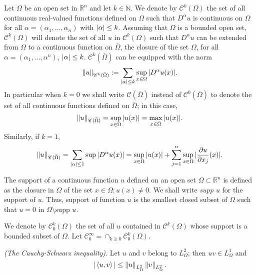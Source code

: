 \begin{notation}
	Let $\Omega$ be an open set in $\mathbb{R}^n$ and let $k \in \mathbb{N}$. We denote by $\mathscr{C}^k(\Omega)$ the set of all continuous real-valued functions defined on $\Omega$ such that $D^\alpha u$ is continuous on $\Omega$ for all $\alpha = (\alpha_1 , \dots, \alpha_n)$ with $\vert\alpha\vert \leq k$. Assuming that $\Omega$ is a bounded open set, $\mathscr{C}^k (\Omega)$ will denote the set of all $u$ in $\mathscr{C}^k (\Omega)$ such that $D^\alpha u$ can be extended from $\Omega$ to a
continuous function on $\bar{\Omega}$, the closure of the set $\Omega$, for all $\alpha = (\alpha_1 , \dots, \alpha^n)$, $\vert\alpha\vert \leq k$.
 $\mathscr{C}^k (\bar{\Omega})$ can be equipped with the norm
	\begin{equation*}
		\left\lVert u\right\rVert_{\mathscr{C}^k(\bar{\Omega})} := \sum_{\vert\alpha\vert \leq k} \sup_{x\in\Omega} \vert D^\alpha u(x)\vert.
	\end{equation*}
	In particular when $k = 0$ we shall write $\mathscr{C}(\bar{\Omega})$ instead of $\mathscr{C}^{0}(\bar{\Omega})$ to denote the set of
all continuous functions defined on $\bar{\Omega}$; in this case,
	\begin{equation*}
		\left\lVert u\right\rVert_{\mathscr{C}(\bar{\Omega})} = \sup_{x\in\Omega} \vert u(x)\vert = \max_{x\in\bar{\Omega}} \vert u(x)\vert.
	\end{equation*}
	Similarly, if $k = 1$,
	\begin{equation*}
		\left\lVert u\right\rVert_{\mathscr{C}(\bar{\Omega})} = \sum_{\vert\alpha\vert\leq 1} \sup \vert D^\alpha u(x)\vert = \sup_{x\in\Omega} \vert u(x)\vert + \sum_{j=1}^{n} \sup_{x\in\Omega} \vert\frac{\partial u}{\partial x_j}(x)\vert.
	\end{equation*}
\end{notation}
\begin{defn}
	The support of a continuous function $u$ defined on an open set $\Omega \subset \mathbb{R}^n$ is defined as the closure in $\Omega$ of the set ${x \in \Omega : u(x) \neq 0}$. We shall write \textit{supp $u$} for the support of $u$. Thus, support of function $u$ is the smallest closed subset of $\Omega$ such that $u = 0$ in
$\Omega\setminus\text{supp } u$.
\end{defn}
We denote by $\mathscr{C}_{0}^{k}(\Omega)$ the set of all $u$ contained in $\mathscr{C}^{k}(\Omega)$ whose support is a bounded
subset of $\Omega$. Let $\mathscr{C}_{0}^{\infty} = \cap_{k \geq 0} \mathscr{C}_{0}^{k}(\Omega)$.
\begin{lemma}
	\textit{(The Cauchy-Schwarz inequality)}. Let $u$ and $v$ belong to $L^2_{\Omega}$; then $uv \in L^1_{\Omega}$ and 
	\begin{equation*}
		\vert\mathop{\langle u, v \rangle}\vert \leq \left\lVert u\right\rVert_{L^2_{\Omega}}  \left\lVert v\right\rVert_{L^2_{\Omega}}.
	\end{equation*}
\end{lemma}
